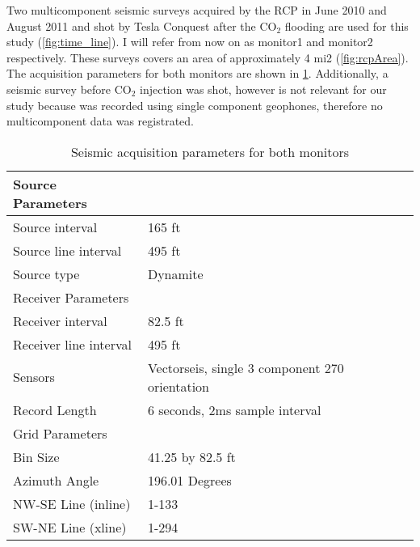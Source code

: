 Two multicomponent seismic surveys acquired by the RCP in June 2010 and 
August 2011 and shot by Tesla Conquest after the CO$_2$ flooding are used 
for this study (\ref{fig:time_line}).  I will refer from now on as monitor1 
and monitor2 respectively. These surveys covers an area of approximately 
4 mi2 (\ref{fig:rcpArea}). The acquisition parameters for both monitors
are shown in \ref{tab:seispar}. Additionally, a seismic survey before
CO$_2$ injection was shot, however is not relevant for our study because 
was recorded using single component geophones, therefore no multicomponent 
data was registrated.




\begin{table}[h!]
\caption{ Seismic acquisition parameters for both monitors \label{tab:seispar}}
\begin{center}
\begin{tabular}{ | l | p{5cm} |}
\hline
Source Parameters             &   \\
\hline
Source interval            & 165 ft  \\
Source line interval           & 495 ft   \\
Source type     & Dynamite   \\
\hline
Receiver Parameters             &   \\
\hline
Receiver interval            & 82.5 ft  \\
Receiver line interval           & 495 ft   \\
Sensors &Vectorseis, single 3 component  270 orientation \\
Record Length & 6 seconds, 2ms sample interval\\
\hline
Grid Parameters             &   \\
\hline
Bin Size & 41.25 by 82.5 ft \\
Azimuth Angle & 196.01 Degrees \\
NW-SE Line (inline) & 1-133 \\
SW-NE Line (xline) & 1-294 \\
\hline
\end{tabular}
\end{center}
\end{table}

